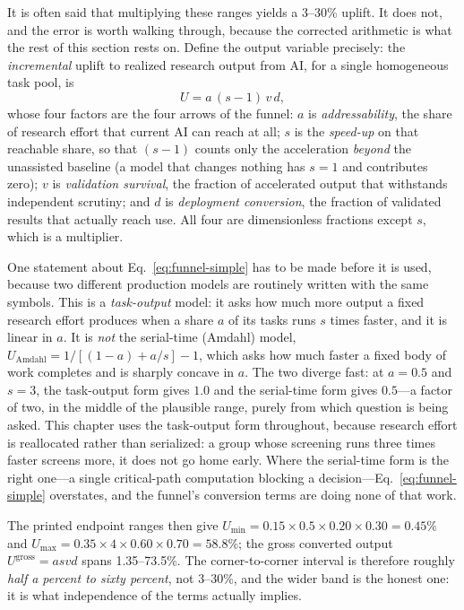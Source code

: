It is often said that multiplying these ranges yields a 3--30\% uplift. It does not, and the error is worth walking through, because the corrected arithmetic is what the rest of this section rests on. Define the output variable precisely: the \emph{incremental} uplift to realized research output from AI, for a single homogeneous task pool, is
\begin{equation}
U = a\,(s-1)\,v\,d,
\label{eq:funnel-simple}
\end{equation}
whose four factors are the four arrows of the funnel: $a$ is \emph{addressability}, the share of research effort that current AI can reach at all; $s$ is the \emph{speed-up} on that reachable share, so that $(s-1)$ counts only the acceleration \emph{beyond} the unassisted baseline (a model that changes nothing has $s=1$ and contributes zero); $v$ is \emph{validation survival}, the fraction of accelerated output that withstands independent scrutiny; and $d$ is \emph{deployment conversion}, the fraction of validated results that actually reach use. All four are dimensionless fractions except $s$, which is a multiplier.

One statement about Eq.~\eqref{eq:funnel-simple} has to be made before it is used, because two different production models are routinely written with the same symbols. This is a \emph{task-output} model: it asks how much more output a fixed research effort produces when a share $a$ of its tasks runs $s$ times faster, and it is linear in $a$. It is \emph{not} the serial-time (Amdahl) model, $U_{\mathrm{Amdahl}} = 1/[(1-a) + a/s] - 1$, which asks how much faster a fixed body of work completes and is sharply concave in $a$. The two diverge fast: at $a = 0.5$ and $s = 3$, the task-output form gives $1.0$ and the serial-time form gives $0.5$---a factor of two, in the middle of the plausible range, purely from which question is being asked. This chapter uses the task-output form throughout, because research effort is reallocated rather than serialized: a group whose screening runs three times faster screens more, it does not go home early. Where the serial-time form is the right one---a single critical-path computation blocking a decision---Eq.~\eqref{eq:funnel-simple} overstates, and the funnel's conversion terms are doing none of that work.

The printed endpoint ranges then give $U_{\min}=0.15\times0.5\times0.20\times0.30=0.45\%$ and $U_{\max}=0.35\times4\times0.60\times0.70=58.8\%$; the gross converted output $U^{\mathrm{gross}}=asvd$ spans 1.35--73.5\%. The corner-to-corner interval is therefore roughly \emph{half a percent to sixty percent}, not 3--30\%, and the wider band is the honest one: it is what independence of the terms actually implies.

